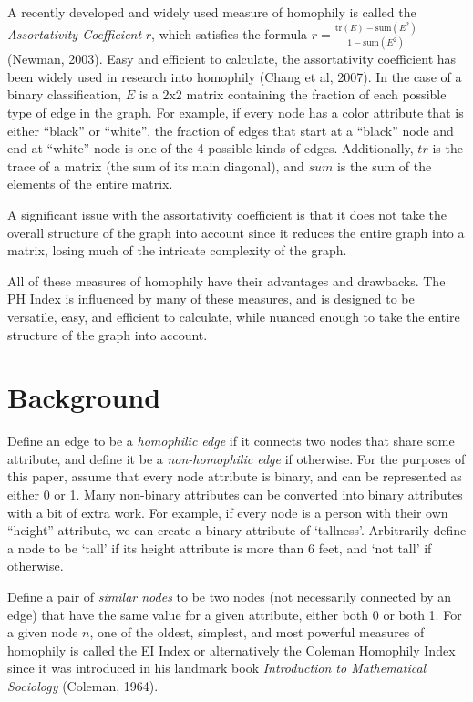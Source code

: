 \documentclass{article}
\begin{document}
A recently developed and widely used measure of homophily is called the
\emph{Assortativity Coefficient} \(r\), which satisfies the formula
\(r = \frac{\mathrm{tr}(E) - \mathrm{sum}(E^{2})}{1 - \mathrm{sum}(E^{2})}\) (Newman, 2003).
Easy and efficient to calculate, the assortativity coefficient has been
widely used in research into homophily (Chang et al, 2007). In the case
of a binary classification, \(E\) is a 2x2 matrix containing the
fraction of each possible type of edge in the graph. For example, if
every node has a color attribute that is either ``black'' or ``white'',
the fraction of edges that start at a ``black'' node and end at
``white'' node is one of the 4 possible kinds of edges. Additionally,
$tr$ is the trace of a matrix (the sum of its main diagonal), and
$sum$ is the sum of the elements of the entire matrix.

A significant issue with the assortativity coefficient is that it does
not take the overall structure of the graph into account since it
reduces the entire graph into a matrix, losing much of the intricate
complexity of the graph.

All of these measures of homophily have their advantages and drawbacks.
The PH Index is influenced by many of these measures, and is designed to
be versatile, easy, and efficient to calculate, while nuanced enough to
take the entire structure of the graph into account.

\section{Background}

Define an edge to be a \emph{homophilic edge} if it connects two nodes
that share some attribute, and define it be a \emph{non-homophilic edge}
if otherwise. For the purposes of this paper, assume that every node
attribute is binary, and can be represented as either 0 or 1. Many
non-binary attributes can be converted into binary attributes with a bit
of extra work. For example, if every node is a person with their own
``height'' attribute, we can create a binary attribute of `tallness'.
Arbitrarily define a node to be `tall' if its height attribute is more
than 6 feet, and `not tall' if otherwise.

Define a pair of \emph{similar nodes} to be two nodes (not necessarily
connected by an edge) that have the same value for a given attribute,
either both 0 or both 1. For a given node $n$, one of the oldest,
simplest, and most powerful measures of homophily is called the EI Index
or alternatively the Coleman Homophily Index since it was introduced in
his landmark book \emph{Introduction to Mathematical Sociology}
(Coleman, 1964).
\end{document}
